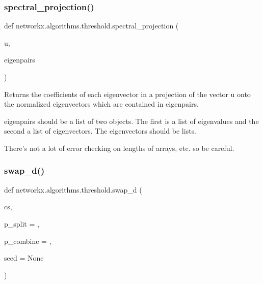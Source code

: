 \subsubsection{\texorpdfstring{spectral\+\_\+projection()}{spectral\_projection()}}
{\footnotesize\ttfamily def networkx.\+algorithms.\+threshold.\+spectral\+\_\+projection (\begin{DoxyParamCaption}\item[{}]{u,  }\item[{}]{eigenpairs }\end{DoxyParamCaption})}

\begin{DoxyVerb}Returns the coefficients of each eigenvector
in a projection of the vector u onto the normalized
eigenvectors which are contained in eigenpairs.

eigenpairs should be a list of two objects.  The
first is a list of eigenvalues and the second a list
of eigenvectors.  The eigenvectors should be lists.

There's not a lot of error checking on lengths of
arrays, etc. so be careful.
\end{DoxyVerb}
 \mbox{\label{namespacenetworkx_1_1algorithms_1_1threshold_a0048b193ccb63bedfa1565170bdf6283}} 
\subsubsection{\texorpdfstring{swap\+\_\+d()}{swap\_d()}}
{\footnotesize\ttfamily def networkx.\+algorithms.\+threshold.\+swap\+\_\+d (\begin{DoxyParamCaption}\item[{}]{cs,  }\item[{}]{p\+\_\+split = {},  }\item[{}]{p\+\_\+combine = {},  }\item[{}]{seed = {\ttfamily None} }\end{DoxyParamCaption})}

